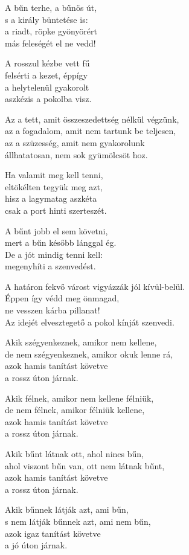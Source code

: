 \begin{dhpverse}

 A bűn terhe, a bűnös út,\\
s a király büntetése is:\\
a riadt, röpke gyönyörért\\
más feleségét el ne vedd!

 A rosszul kézbe vett fű\\
felsérti a kezet, éppígy\\
a helytelenül gyakorolt\\
aszkézis a pokolba visz.

 Az a tett, amit összeszedettség nélkül végzünk,\\
az a fogadalom, amit nem tartunk be teljesen,\\
az a szüzesség, amit nem gyakorolunk\\
állhatatosan, nem sok gyümölcsöt hoz.

 Ha valamit meg kell tenni,\\
eltökélten tegyük meg azt,\\
hisz a lagymatag aszkéta\\
csak a port hinti szerteszét.

 A bűnt jobb el sem követni,\\
mert a bűn később lánggal ég.\\
De a jót mindig tenni kell:\\
megenyhíti a szenvedést.

 A határon fekvő várost vigyázzák jól kívül-belül.\\
Éppen így védd meg önmagad,\\
ne vesszen kárba pillanat!\\
Az idejét elvesztegető a pokol kínját szenvedi.

\end{dhpverse}
\newpage
\begin{dhpverse}

 Akik szégyenkeznek, amikor nem kellene,\\
de nem szégyenkeznek, amikor okuk lenne rá,\\
azok hamis tanítást követve\\
a rossz úton járnak.

 Akik félnek, amikor nem kellene félniük,\\
de nem félnek, amikor félniük kellene,\\
azok hamis tanítást követve\\
a rossz úton járnak.

 Akik bűnt látnak ott, ahol nincs bűn,\\
ahol viszont bűn van, ott nem látnak bűnt,\\
azok hamis tanítást követve\\
a rossz úton járnak.

 Akik bűnnek látják azt, ami bűn,\\
s nem látják bűnnek azt, ami nem bűn,\\
azok igaz tanítást követve\\
a jó úton járnak.

\end{dhpverse}
